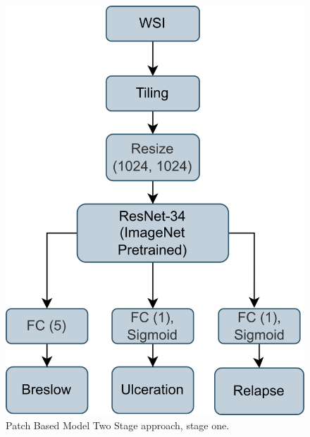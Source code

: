 \documentclass[conference]{IEEEtran}
\begin{document}
\begin{figure}[h!]
  \centering
    \includegraphics[scale=0.6]{images/page3.png}
  \caption{Patch Based Model Two Stage approach, stage one.}
  \label{fig:pbm_s1}
\end{figure}
\end{document}
